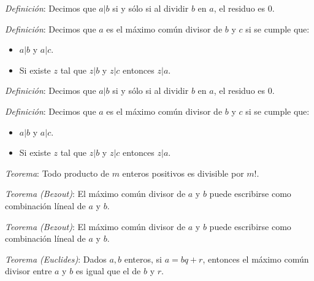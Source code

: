 \documentclass{beamer}
\begin{document}
  \begin{frame}
    \textit{Definición}: Decimos que $a|b$ si y sólo si al dividir $b$ en $a$, el 
    residuo es $0$.
    \newline\newline

    \textit{Definición}: Decimos que $a$ es el máximo común divisor 
    de $b$ y $c$ si se cumple que:
    \begin{itemize}
      \item $a|b$ y $a|c$.
      \item Si existe $z$ tal que $z|b$ y $z|c$ entonces $z|a$.
    \end{itemize}
  \end{frame}

  \begin{frame}
    \textit{Definición}: Decimos que $a|b$ si y sólo si al dividir $b$ en $a$, el 
    residuo es $0$.
    \newline\newline

    \textit{Definición}: Decimos que $a$ es el máximo común divisor 
    de $b$ y $c$ si se cumple que:
    \begin{itemize}
      \item $a|b$ y $a|c$.
      \item Si existe $z$ tal que $z|b$ y $z|c$ entonces $z|a$.
    \end{itemize}

    \textit{Teorema}: Todo producto de $m$ enteros positivos es divisible
    por $m!$.
  \end{frame}

  \begin{frame}
    \textit{Teorema (Bezout)}: El máximo común divisor de $a$ y $b$ puede escribirse 
    como combinación líneal de $a$ y $b$.
  \end{frame}

  \begin{frame}
    \textit{Teorema (Bezout)}: El máximo común divisor de $a$ y $b$ puede escribirse 
    como combinación líneal de $a$ y $b$.
    \newline\newline

    \textit{Teorema (Euclides)}: Dados $a,b$ enteros, si $a = bq + r$, entonces el máximo
    común divisor entre $a$ y $b$ es igual que el de $b$ y $r$.
  \end{frame}
\end{document}
